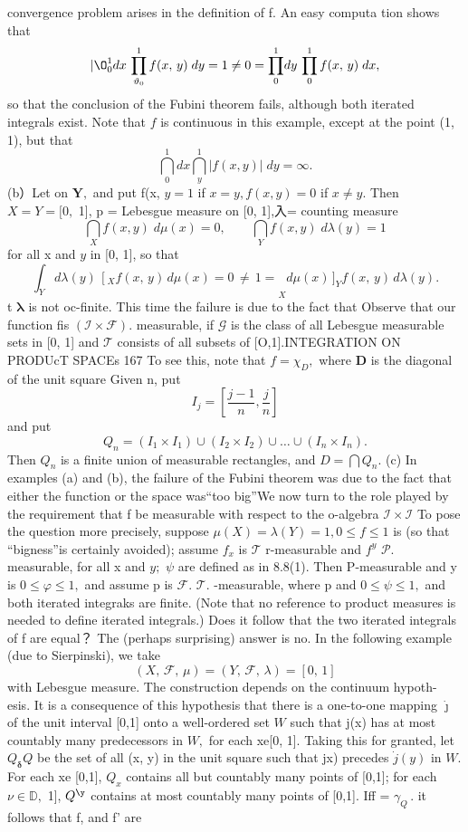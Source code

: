 convergence problem arises in the definition of f. An easy computa tion shows that $$ |\O_{0}^{1}d x\,\prod_{\vartheta_{0}}^{1}f(x,\,y)\;d y=1\neq0=\prod_{0}^{1}\!d y\,\prod_{0}^{1}f(x,\,y)\;d x, $$ so that the conclusion of the Fubini theorem fails, although both iterated integrals exist. Note that $\boldsymbol{\mathit{f}}$ is continuous in this example, except at the point (1, 1), but that $$ \bigcap_{0}^{1}d x\bigcap_{y}^{1}|f(x,y)|\;d y=\infty. $$ (b）Let on ${\boldsymbol{Y}},$ and put f(x, $\scriptstyle y=1$ if $x=y,f(x,y)=0$ if $x\neq y.$ Then $X=Y=[0,$ 1], p = Lebesgue measure on [0, 1],入= counting measure $$ \bigcap_{X}f(x,y)\;d\mu(x)=0,\qquad\bigcap_{Y}f(x,y)\;d\lambda(y)=1 $$ for all x and $\scriptstyle{y}$ in [0, 1], so that $$ \left.\int_{Y}^{}d\lambda(y)\,\left[_{X}f(x,\,y)\,d\mu(x)=0\,\neq\,1=\right.\right._{X}^{}d\mu(x)\, ]_{Y}^{}f(x,\,y)\,d\lambda(y). $$ t $\boldsymbol{\lambda}$ is not oc-finite. This time the failure is due to the fact that Observe that our function fis $({\mathcal{I}}\times{\mathcal{F}}).$ measurable, if ${\mathcal{G}}$ is the class of all Lebesgue measurable sets in [0, 1] and ${\mathcal{T}}$ consists of all subsets of [O,1].INTEGRATION ON PRODUcT SPACEs 167 To see this, note that $f=\chi_{D},$ where ${\boldsymbol{D}}$ is the diagonal of the unit square Given n, put $$ I_{j}=\left[{\frac{j-1}{n}},{\frac{j}{n}}\right] $$ and put $$ Q_{n}=(I_{1}\times I_{1})\cup(I_{2}\times I_{2})\cup\dots\cup(I_{n}\times I_{n}). $$ Then $Q_{n}$ is a finite union of measurable rectangles, and $D=\bigcap Q_{n}.$ (c) In examples (a) and (b), the failure of the Fubini theorem was due to the fact that either the function or the space was“too big”We now turn to the role played by the requirement that f be measurable with respect to the o-algebra ${\mathcal{I}}\times{\mathcal{I}}$ To pose the question more precisely, suppose $\mu(X)=\lambda(Y)=1,0\leq f\leq1$ is (so that “bigness”is certainly avoided); assume $f_{x}$ is ${\mathcal{T}}$ r-measurable and $f^{y}$ ${\mathcal{P}}.$ measurable, for all x and $y;$ $\psi$ are defined as in 8.8(1). Then P-measurable and y is $0\leq\varphi\leq1,$ and assume p is ${\mathcal{F}}.$ ${\mathcal{T}}.$ -measurable, where p and $0\leq\psi\leq1,$ and both iterated integraks are finite. (Note that no reference to product measures is needed to define iterated integrals.) Does it follow that the two iterated integrals of f are equal？ The (perhaps surprising) answer is no. In the following example (due to Sierpinski), we take $$ (X,\,{\mathcal{F}},\,\mu)=(Y,\,{\mathcal{F}},\,\lambda)=[0,\,1] $$ with Lebesgue measure. The construction depends on the continuum hypoth- esis. It is a consequence of this hypothesis that there is a one-to-one mapping $\dot{\boldsymbol{\jmath}}$ of the unit interval [0,1] onto a well-ordered set $\textstyle W$ such that j(x) has at most countably many predecessors in $W,$ for each xe[0, 1]. Taking this for granted, let $Q_{\mathbf{\delta}}Q$ be the set of all (x, y) in the unit square such that jx) precedes ${\dot{j}}(y)$ in $W.$ For each xe [0,1], $Q_{x}$ contains all but countably many points of [0,1]; for each $\nu\in\mathbb{D},$ 1], $Q^{\y}$ contains at most countably many points of [0,1]. Iff = $\gamma_{Q}\,.$ it follows that f, and f' are 